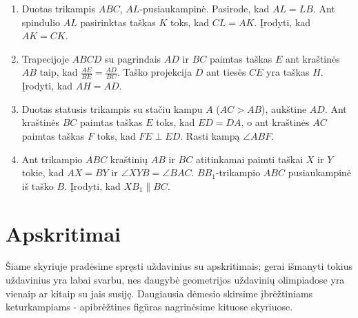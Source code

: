 \begin{enumerate}
\item Duotas trikampis $ABC$, $AL$-pusiaukampinė. Pasirode, kad $AL = LB$.
  Ant spindulio $AL$ pasirinktas taškas $K$ toks, kad $CL = AK$. Įrodyti,
  kad $AK = CK$.
\item Trapecijoje $ABCD$ su pagrindais $AD$ ir $BC$ paimtas taškas $E$ ant
  kraštinės $AB$ taip, kad $\frac{AE}{BE} = \frac{AD}{BC}$. Taško
  projekcija $D$ ant tiesės $CE$ yra taškas $H$. Įrodyti, kad $AH = AD$.
\item Duotas statusis trikampis su stačiu kampu $A$ ($AC>AB$), aukštine $AD$. Ant
  kraštinės $BC$ paimtas taškas $E$ toks, kad $ED = DA$, o ant kraštinės $AC$
  paimtas taškas $F$ toks, kad $FE \perp{ED}$. Rasti kampą $\angle ABF$.
\item Ant trikampio $ABC$ kraštinių $AB$  ir $BC$ atitinkamai paimti taškai
  $X$ ir $Y$ tokie, kad $AX=BY$ ir $\angle XYB = \angle BAC$.
  $BB_1$-trikampio $ABC$ pusiaukampinė iš taško $B$. Įrodyti, kad $XB_1
  \parallel{BC}$.
\end{enumerate}

\newpage 
\section{Apskritimai}

Šiame skyriuje pradėsime spręsti uždavinius su apskritimais; gerai
išmanyti tokius uždavinius yra labai svarbu, nes daugybė
geometrijos uždavinių olimpiadose yra vienaip ar kitaip su jais susiję.
Daugiausia dėmesio skirsime įbrėžtiniams keturkampiams - apibrėžtines
figūras nagrinėsime kituose skyriuose.  

